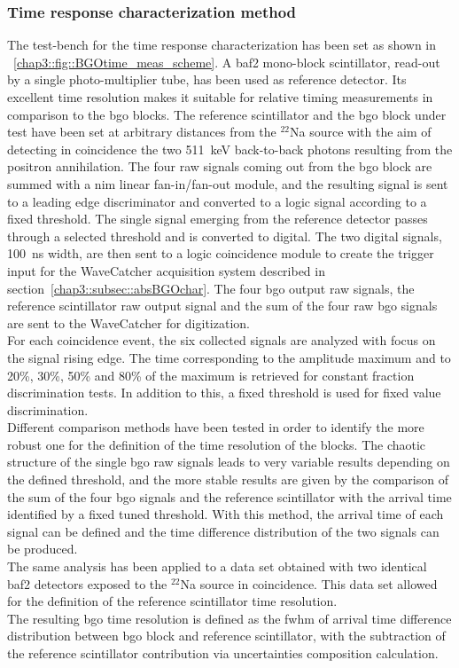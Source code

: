 \subsubsection{Time response characterization method}\label{chap3::subsubsec::absTimeMethod}

The test-bench for the time response characterization has been set as shown in \figurename~\ref{chap3::fig::BGOtime_meas_scheme}. A \gls{baf2} mono-block scintillator, read-out by a single photo-multiplier tube, has been used as reference detector. Its excellent time resolution makes it suitable for relative timing measurements in comparison to the \gls{bgo} blocks. The reference scintillator and the \gls{bgo} block under test have been set at arbitrary distances from the $^{22}$Na source with the aim of detecting in coincidence the two 511~keV back-to-back photons resulting from the positron annihilation. The four raw signals coming out from the \gls{bgo} block are summed with a \gls{nim} linear fan-in/fan-out module, and the resulting signal is sent to a leading edge discriminator and converted to a logic signal according to a fixed threshold. The single signal emerging from the reference detector passes through a selected threshold and is converted to digital. The two digital signals, 100~ns width, are then sent to a logic coincidence module to create the trigger input for the WaveCatcher acquisition system described in section~\ref{chap3::subsec::absBGOchar}. The four \gls{bgo} output raw signals, the reference scintillator raw output signal and the sum of the four raw \gls{bgo} signals are sent to the WaveCatcher for digitization.\\
For each coincidence event, the six collected signals are analyzed with focus on the signal rising edge. The time corresponding to the amplitude maximum and to 20\%, 30\%, 50\% and 80\% of the maximum is retrieved for constant fraction discrimination tests. In addition to this, a fixed threshold is used for fixed value discrimination.\\
Different comparison methods have been tested in order to identify the more robust one for the definition of the time resolution of the blocks. The chaotic structure of the single \gls{bgo} raw signals leads to very variable results depending on the defined threshold, and the more stable results are given by the comparison of the sum of the four \gls{bgo} signals and the reference scintillator with the arrival time identified by a fixed tuned threshold. With this method, the arrival time of each signal can be defined and the time difference distribution of the two signals can be produced.\\
The same analysis has been applied to a data set obtained with two identical \gls{baf2} detectors exposed to the $^{22}$Na source in coincidence. This data set allowed for the definition of the reference scintillator time resolution.\\
The resulting \gls{bgo} time resolution is defined as the \gls{fwhm} of arrival time difference distribution between \gls{bgo} block and reference scintillator, with the subtraction of the reference scintillator contribution via uncertainties composition calculation.\\


